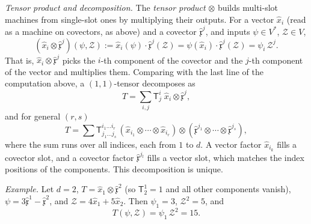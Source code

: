 \documentclass[11pt]{article}
\newcommand{\dual}{V^{*}}
\begin{document}
\smallskip
\noindent\emph{Tensor product and decomposition.} The \emph{tensor product} $\otimes$ builds multi-slot machines from single-slot ones by multiplying their outputs. For a vector $\hat x_i$ (read as a machine on covectors, as above) and a covector $\hat{\mathfrak x}^j$, and inputs $\psi\in\dual$, $\mathcal Z\in V$,
\[
(\hat x_i\otimes\hat{\mathfrak x}^j)(\psi,\mathcal Z):=\hat x_i(\psi)\cdot\hat{\mathfrak x}^j(\mathcal Z)=\psi(\hat x_i)\cdot\hat{\mathfrak x}^j(\mathcal Z)=\psi_i\,\mathcal Z^j.
\]
That is, $\hat x_i\otimes\hat{\mathfrak x}^j$ picks the $i$-th component of the covector and the $j$-th component of the vector and multiplies them. Comparing with the last line of the computation above, a $(1,1)$-tensor decomposes as
\[
T=\sum_{i,j}\mathsf T^i_j\;\hat x_i\otimes\hat{\mathfrak x}^j,
\]
and for general $(r,s)$
\[
T=\sum \mathsf T^{i_1\dots i_r}_{j_1\dots j_s}\,(\hat x_{i_1}\otimes\cdots\otimes\hat x_{i_r})\otimes(\hat{\mathfrak x}^{j_1}\otimes\cdots\otimes\hat{\mathfrak x}^{j_s}),
\]
where the sum runs over all indices, each from $1$ to $d$. A vector factor $\hat x_{i_k}$ fills a covector slot, and a covector factor $\hat{\mathfrak x}^{j_l}$ fills a vector slot, which matches the index positions of the components. This decomposition is unique.

\smallskip
\noindent\emph{Example.} Let $d=2$, $T=\hat x_1\otimes\hat{\mathfrak x}^2$ (so $\mathsf T^1_2=1$ and all other components vanish), $\psi=3\hat{\mathfrak x}^1-\hat{\mathfrak x}^2$, and $\mathcal Z=4\hat x_1+5\hat x_2$. Then $\psi_1=3$, $\mathcal Z^2=5$, and
\[
T(\psi,\mathcal Z)=\psi_1\,\mathcal Z^2=15.
\]
\end{document}

